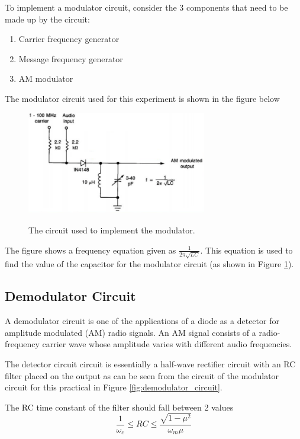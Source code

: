 \documentclass[12pt, a4paper]{article}
\begin{document}
		To implement a modulator circuit, consider the 3 components that need to be made up by the circuit:
		\begin{enumerate}
			\item Carrier frequency generator
			\item Message frequency generator
			\item AM modulator
		\end{enumerate}

		The modulator circuit used for this experiment is shown in the figure below

		\begin{figure}[H]
			\includegraphics[width=0.7\textwidth]{images/modulator_circuit.png}
			\label{fig:modulator_circuit}
			\caption{The circuit used to implement the modulator.}
		\end{figure}

		The figure shows a frequency equation given as $\frac{1}{2\pi\sqrt{LC}}$. This equation is used to find the value of the capacitor for the modulator circuit (as shown in Figure \ref{fig:modulator_circuit}).
	\subsection{Demodulator Circuit}
		A demodulator circuit is one of the applications of a diode as a detector for amplitude modulated (AM) radio signals. An AM signal consists of a radio-frequency carrier wave whose amplitude varies with different audio frequencies.

		The detector circuit circuit is essentially a half-wave rectifier circuit with an RC filter placed on the output as can be seen from the circuit of the modulator circuit for this practical in Figure \ref{fig:demodulator_circuit}.

		The RC time constant of the filter should fall between 2 values
		\begin{equation}
			\label{eqn:time_const_demodulator_circuit}
			\frac{1}{\omega_c} \le RC \le \frac{\sqrt{1-\mu^2}}{\omega_m\mu}
		\end{equation}
\end{document}
